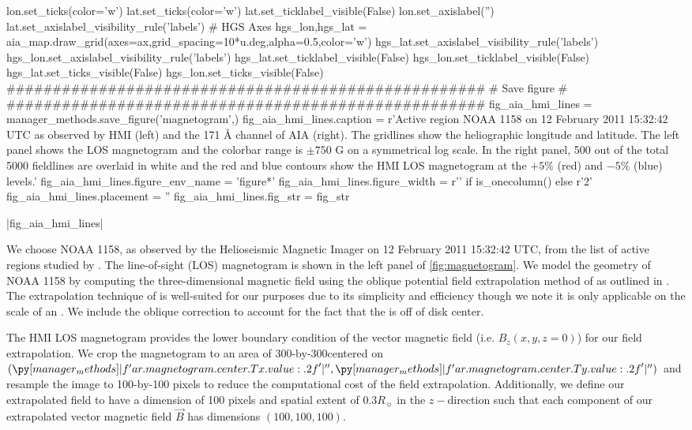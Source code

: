 \begin{pycode}
lon.set_ticks(color='w')
lat.set_ticks(color='w')
lat.set_ticklabel_visible(False)
lon.set_axislabel('')
lat.set_axislabel_visibility_rule('labels')
# HGS Axes
hgs_lon,hgs_lat = aia_map.draw_grid(axes=ax,grid_spacing=10*u.deg,alpha=0.5,color='w')
hgs_lat.set_axislabel_visibility_rule('labels')
hgs_lon.set_axislabel_visibility_rule('labels')
hgs_lat.set_ticklabel_visible(False)
hgs_lon.set_ticklabel_visible(False)
hgs_lat.set_ticks_visible(False)
hgs_lon.set_ticks_visible(False)
####################################################
#                  Save figure                     #
####################################################
fig_aia_hmi_lines = manager_methods.save_figure('magnetogram',)
fig_aia_hmi_lines.caption = r'Active region NOAA 1158 on 12 February 2011 15:32:42 UTC as observed by HMI (left) and the 171 \AA{} channel of AIA (right). The gridlines show the heliographic longitude and latitude. The left panel shows the LOS magnetogram and the colorbar range is $\pm750$ G on a symmetrical log scale. In the right panel, 500 out of the total 5000 fieldlines are overlaid in white and the red and blue contours show the HMI LOS magnetogram at the $+5\%$ (red) and $-5\%$ (blue) levels.'
fig_aia_hmi_lines.figure_env_name = 'figure*'
fig_aia_hmi_lines.figure_width = r'\columnwidth' if is_onecolumn() else r'2\columnwidth'
fig_aia_hmi_lines.placement = ''
fig_aia_hmi_lines.fig_str = fig_str
\end{pycode}
|fig_aia_hmi_lines|

We choose \AR{} NOAA 1158, as observed by the Helioseismic Magnetic Imager \citep[HMI,][]{hoeksema_helioseismic_2014} on 12 February 2011 15:32:42 UTC, from the list of active regions studied by \citet{warren_systematic_2012}. The line-of-sight (LOS) magnetogram is shown in the left panel of \autoref{fig:magnetogram}. We model the geometry of \AR{} NOAA 1158 by computing the three-dimensional magnetic field using the oblique potential field extrapolation method of \citet{schmidt_observable_1964} as outlined in \citet[section 3]{sakurai_greens_1982}. The extrapolation technique of \citeauthor{schmidt_observable_1964} is well-suited for our purposes due to its simplicity and efficiency though we note it is only applicable on the scale of an \AR{}. We include the oblique correction to account for the fact that the \AR{} is off of disk center. 

The HMI LOS magnetogram provides the lower boundary condition of the vector magnetic field (i.e. $B_z(x,y,z=0)$) for our field extrapolation. We crop the magnetogram to an area of 300\arcsec-by-300\arcsec centered on $(\py[manager_methods]|f'{ar.magnetogram.center.Tx.value:.2f}'|\arcsec,\py[manager_methods]|f'{ar.magnetogram.center.Ty.value:.2f}'|\arcsec)$ and resample the image to 100-by-100 pixels to reduce the computational cost of the field extrapolation. Additionally, we define our extrapolated field to have a dimension of 100 pixels and spatial extent of $0.3R_{\sun}$ in the $z-$direction such that each component of our extrapolated vector magnetic field $\vec{B}$ has dimensions $(100,100,100)$.

